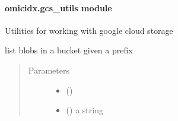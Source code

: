 \documentclass[letterpaper,10pt,english]{sphinxmanual}
\begin{document}
\paragraph{omicidx.gcs\_utils module}
\label{\detokenize{omicidx.gcs_utils:module-omicidx.gcs_utils}}\label{\detokenize{omicidx.gcs_utils:omicidx-gcs-utils-module}}\label{\detokenize{omicidx.gcs_utils::doc}}
Utilities for working with google cloud storage

\begin{fulllineitems}
\label{\detokenize{omicidx.gcs_utils:omicidx.gcs_utils.list_blobs}}
list blobs in a bucket given a prefix
\begin{quote}\begin{description}
\item[{Parameters}] \leavevmode\begin{itemize}
\item {} 
 () \textendash{} 

\item {} 
 () \textendash{} a  string

\end{itemize}

\end{description}\end{quote}

\end{fulllineitems}

\end{document}
